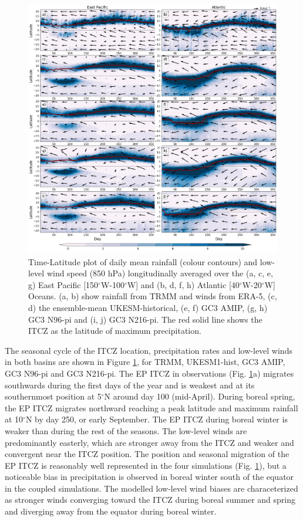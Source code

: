 \begin{figure}[t!]
\centering
 \includegraphics[width=\linewidth]{figures/fig3_p2_v3.png}
\caption[Seasonal evolution of Atlantic and Pacific ITCZ]{ Time-Latitude plot of daily mean rainfall (colour contours) and low-level wind speed (850 hPa) longitudinally averaged over the (a, c, e, g) East Pacific [150$^\circ$W-100$^\circ$W] and (b, d, f, h) Atlantic [40$^\circ$W-20$^\circ$W] Oceans. (a, b) show rainfall from TRMM and winds from ERA-5, (c, d) the ensemble-mean UKESM-historical, (e, f) GC3 AMIP, (g, h) GC3 N96-pi and (i, j) GC3 N216-pi. The red solid line shows the ITCZ as the latitude of maximum precipitation.  }
\label{fig:4}
\end{figure}


The seasonal cycle of the ITCZ location, precipitation rates and low-level winds in both basins are shown in Figure \ref{fig:4}, for TRMM, UKESM1-hist, GC3 AMIP, GC3 N96-pi and GC3 N216-pi.   %
The EP ITCZ in observations (Fig. \ref{fig:4}a) migrates southwards during the first days of the year and is weakest and at its southernmost position at 5$^\circ$N around day 100 (mid-April).  
During boreal spring, the EP ITCZ migrates northward reaching a peak latitude and maximum rainfall at 10$^\circ$N by day 250, or early September. The EP ITCZ during boreal winter is weaker than during the rest of the seasons.
The low-level winds are predominantly easterly, which are stronger away from the ITCZ and weaker and convergent near the ITCZ position.
The position and seasonal migration of the EP ITCZ is reasonably well represented in the four simulations (Fig. \ref{fig:4}), but a noticeable bias in precipitation is observed in  boreal winter south of the equator in the coupled simulations. The modelled  low-level wind biases are characeterized as stronger winds converging toward the ITCZ during boreal summer and spring and diverging away from the equator during boreal winter. 

